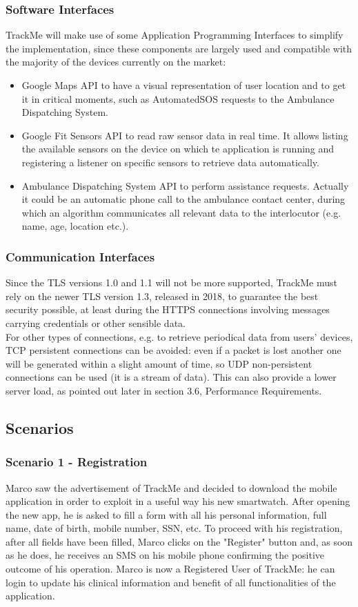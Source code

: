 \documentclass[12pt,a4paper]{article}
\begin{document}
	\subsubsection{Software Interfaces}
		TrackMe will make use of some Application Programming Interfaces to simplify the implementation, since these components are largely used and compatible with the majority of the devices currently on the market:
		\begin{itemize}
			\item Google Maps API to have a visual representation of user location and to get it in critical moments, such as AutomatedSOS requests to the Ambulance Dispatching System.
			\item Google Fit Sensors API to read raw sensor data in real time. It allows listing the available sensors on the device on which te application is running and registering a listener on specific sensors to retrieve data automatically.
			\item Ambulance Dispatching System API to perform assistance requests. Actually it could be an automatic phone call to the ambulance contact center, during which an algorithm communicates all relevant data to the interlocutor (e.g. name, age, location etc.).
		\end{itemize}
	\subsubsection{Communication Interfaces}
			Since the TLS versions 1.0 and 1.1 will not be more supported, TrackMe must rely on the newer TLS version 1.3, released in 2018, to guarantee the best security possible, at least during the HTTPS connections involving messages carrying credentials or other sensible data. 
			\\
			For other types of connections, e.g. to retrieve periodical data from users' devices, TCP persistent connections can be avoided: even if a packet is lost another one will be generated within a slight amount of time, so UDP non-persistent connections can be used (it is a stream of data). This can also provide a lower server load, as pointed out later in section 3.6, Performance Requirements.
	
	
	\newpage
	\subsection{Scenarios}
	\subsubsection*{Scenario 1 - Registration}
		Marco saw the advertisement of TrackMe and decided to download the mobile application in order to exploit in a useful way his new smartwatch. After opening the new app, he is asked to fill a form with all his personal information, full name, date of birth, mobile number, SSN, etc. To proceed with his registration, after all fields have been filled, Marco clicks on the "Register" button and, as soon as he does, he receives an SMS on his mobile phone confirming the positive outcome of his operation. Marco is now a Registered User of TrackMe: he can login to update his clinical information and benefit of all functionalities of the application.
		
\end{document}
